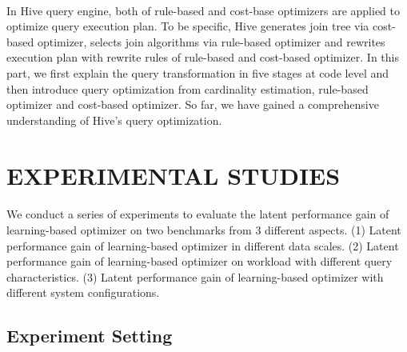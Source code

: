    \paragraph{}
    In Hive query engine, both of rule-based and cost-base optimizers are applied to optimize query execution plan. To be specific, Hive generates join 
    tree via cost-based optimizer, selects join algorithms via rule-based optimizer and rewrites execution plan with rewrite rules of rule-based
    and cost-based optimizer. In this part, we first explain the query transformation in five stages at code level and then introduce query optimization from 
    cardinality estimation, rule-based optimizer and cost-based optimizer. So far, we have gained a comprehensive understanding of Hive's query optimization.

\section{EXPERIMENTAL STUDIES}
\label{experiments}
    \paragraph{}
    We conduct a series of experiments to evaluate the latent performance gain of learning-based optimizer on two benchmarks from 3 different aspects.
    (1) Latent performance gain of learning-based optimizer in different data scales. (2) Latent performance gain of learning-based optimizer on workload with 
    different query characteristics. (3) Latent performance gain of learning-based optimizer with different system configurations. 
    \subsection{Experiment Setting}
